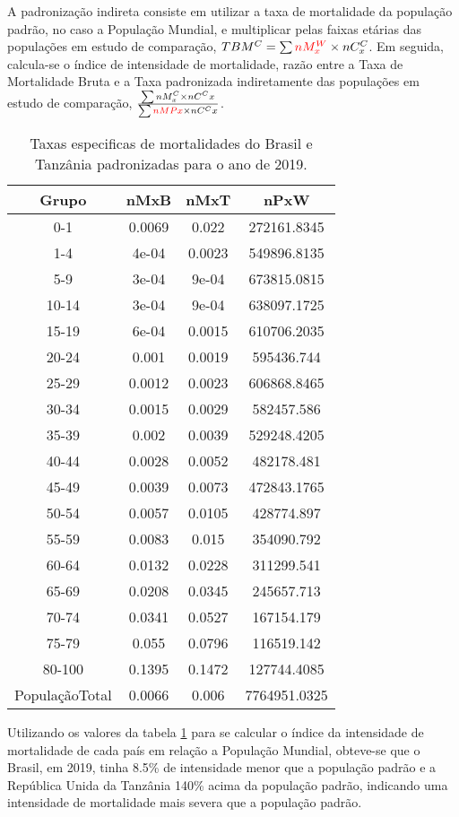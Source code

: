 A padronização indireta consiste em utilizar a taxa de mortalidade da população padrão, no caso a População Mundial, e multiplicar pelas faixas etárias das populações em estudo de comparação, $ TBM^C = \sum  \textcolor{red}{nM^W_x} \times{nC^C_x}  $. Em seguida, calcula-se o índice de intensidade de mortalidade, razão entre a Taxa de Mortalidade Bruta e a Taxa padronizada indiretamente das populações em estudo de comparação, \(\frac{   {\sum nM^C_x \times nC^Cx} }
{ {\sum \textcolor{red}{nMPx} \times nC^Cx}} \).

\begin{table}[H]
\centering
  \caption{Taxas especificas de mortalidades do Brasil e Tanzânia padronizadas para o ano de 2019.}
  \label{tab:dfPadInd}
\begin{tabular}{cccc}
\toprule
Grupo & nMxB & nMxT & nPxW \\
\midrule
0-1 & 0.0069 & 0.022 & 272161.8345 \\
1-4 & 4e-04 & 0.0023 & 549896.8135 \\
5-9 & 3e-04 & 9e-04 & 673815.0815 \\
10-14 & 3e-04 & 9e-04 & 638097.1725 \\
15-19 & 6e-04 & 0.0015 & 610706.2035 \\
20-24 & 0.001 & 0.0019 & 595436.744 \\
25-29 & 0.0012 & 0.0023 & 606868.8465 \\
30-34 & 0.0015 & 0.0029 & 582457.586 \\
35-39 & 0.002 & 0.0039 & 529248.4205 \\
40-44 & 0.0028 & 0.0052 & 482178.481 \\
45-49 & 0.0039 & 0.0073 & 472843.1765 \\
50-54 & 0.0057 & 0.0105 & 428774.897 \\
55-59 & 0.0083 & 0.015 & 354090.792 \\
60-64 & 0.0132 & 0.0228 & 311299.541 \\
65-69 & 0.0208 & 0.0345 & 245657.713 \\
70-74 & 0.0341 & 0.0527 & 167154.179 \\
75-79 & 0.055 & 0.0796 & 116519.142 \\
80-100 & 0.1395 & 0.1472 & 127744.4085 \\
PopulaçãoTotal & 0.0066 & 0.006 & 7764951.0325 \\
\bottomrule
\end{tabular}
\end{table}

Utilizando os valores da tabela \ref{tab:dfPadInd} para se calcular o índice da intensidade de mortalidade de cada país em relação a População Mundial, obteve-se que o Brasil, em 2019, tinha 8.5\% de intensidade menor que a população padrão e a República Unida da Tanzânia 140\% acima da população padrão, indicando uma intensidade de mortalidade mais severa que a população padrão.